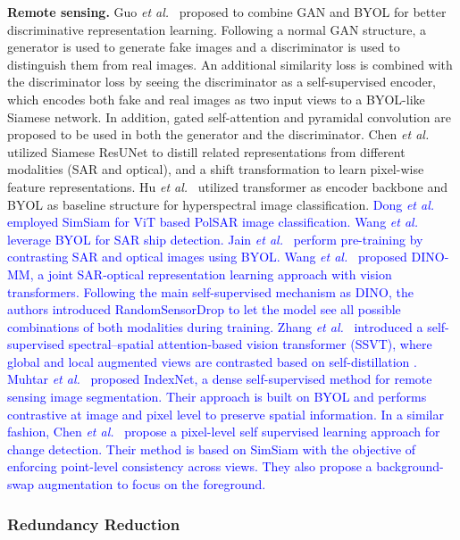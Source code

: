 \documentclass[lettersize,journal]{IEEEtran}
\newcommand{\etal}{\textit{et al.}}
\begin{document}
\textbf{Remote sensing.} Guo \etal~\cite{guo2021self} proposed to combine GAN and BYOL for better discriminative representation learning. Following a normal GAN structure, a generator is used to generate fake images and a discriminator is used to distinguish them from real images. An additional similarity loss is combined with the discriminator loss by seeing the discriminator as a self-supervised encoder, which encodes both fake and real images as two input views to a BYOL-like Siamese network. In addition, gated self-attention and pyramidal convolution are proposed to be used in both the generator and the discriminator. Chen \etal~\cite{chen2021self0,chen2021self2} utilized Siamese ResUNet to distill related representations from different modalities (SAR and optical), and a shift transformation to learn pixel-wise feature representations. Hu \etal~\cite{hu2021contrastive} utilized transformer as encoder backbone and BYOL as baseline structure for hyperspectral image classification. 
\textcolor{blue}{
Dong \etal~\cite{dong2021exploring} employed SimSiam for ViT based PolSAR image classification. Wang \etal~\cite{wang2022fiad} leverage BYOL for SAR ship detection. Jain \etal~\cite{jain2022self} perform pre-training by contrasting SAR and optical images using BYOL. Wang \etal~\cite{wang2022self} proposed DINO-MM, a joint SAR-optical representation learning approach with vision transformers. Following the main self-supervised mechanism as DINO, the authors introduced RandomSensorDrop to let the model see all possible combinations of both modalities during training. Zhang \etal~\cite{zhang2022self} introduced a self-supervised spectral–spatial attention-based vision transformer (SSVT), where global and local augmented views are contrasted based on self-distillation \cite{zhang2019your}. Muhtar \etal~\cite{muhtar2022index} proposed IndexNet, a dense self-supervised method for remote sensing image segmentation. Their approach is built on BYOL and performs contrastive at image and pixel level to preserve spatial information. In a similar fashion, Chen \etal~\cite{chen2022semantic} propose a pixel-level self supervised learning approach for change detection. Their method is based on SimSiam with the objective of enforcing point-level consistency across views. They also propose a background-swap augmentation to focus on the foreground.
}

\subsubsection{Redundancy Reduction}
\end{document}
